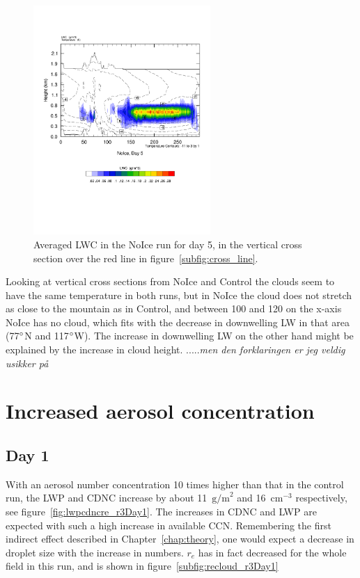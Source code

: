 \begin{figure}
\centering
\includegraphics[width=0.6\textwidth]{results/noice/crossSec_LWC_NoIce_Day5.pdf}
\caption{Averaged LWC in the NoIce run for day 5, in the vertical cross section over the red line in figure~\ref{subfig:cross_line}.}
\label{fig:cross_LWC_r2Day5}
\end{figure}

Looking at vertical cross sections from NoIce and Control the clouds seem to have the same temperature in both runs, but in NoIce the cloud does not stretch as close to the mountain as in Control, and between 100 and 120 on the x-axis NoIce has no cloud, which fits with the decrease in downwelling LW in that area (77$\degree$N and 117$\degree$W). The increase in downwelling LW on the other hand might be explained by the increase in cloud height. .....\textit{men den forklaringen er jeg veldig usikker på}

\section{Increased aerosol concentration}
\subsection{Day 1}
With an aerosol number concentration 10 times higher than that in the control run, the LWP and CDNC increase by about 11~$\text{g/m}^2$ and 16~$\text{cm}^{-3}$ respectively, see figure~\ref{fig:lwpcdncre_r3Day1}. The increases in CDNC and LWP are expected with such a high increase in available CCN. Remembering the first indirect effect described in Chapter~\ref{chap:theory}, one would expect a decrease in droplet size with the increase in numbers. $r_e$ has in fact decreased for the whole field in this run, and is shown in figure~\ref{subfig:recloud_r3Day1}

